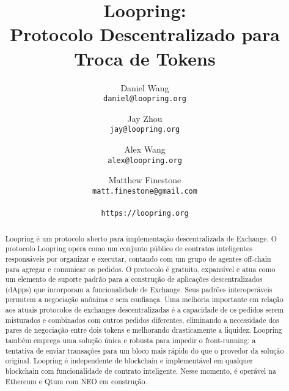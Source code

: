 \documentclass[UTF8,nofonts]{article}
\title{\textbf{Loopring:}\\\textbf{Protocolo Descentralizado para Troca de Tokens}}
\author{
  Daniel Wang\\
  \texttt{daniel@loopring.org}\\
  \and
  	Jay Zhou\\
  	\texttt{jay@loopring.org}\\
  	\and
  	Alex Wang\\
  	\texttt{alex@loopring.org}\\
  	\and
  	Matthew Finestone\\
  	\texttt{matt.finestone@gmail.com}\\ 
  \\
  \texttt{https://loopring.org}
 }
\begin{document}
\maketitle


\begin{abstract}
Loopring é um protocolo aberto para implementação descentralizada de Exchange. O protocolo Loopring opera como um conjunto público de contratos inteligentes responsáveis por organizar e executar, contando com um grupo de agentes off-chain para agregar e comunicar os pedidos. O protocolo é gratuito, expansível e atua como um elemento de suporte padrão para a construção de aplicações descentralizados (dApps) que incorporam a funcionalidade de Exchange. Seus padrões interoperáveis permitem a negociação anônima e sem confiança. Uma melhoria importante em relação aos atuais protocolos de exchanges descentralizadas é a capacidade de os pedidos serem misturados e combinados com outros pedidos diferentes, eliminando a necessidade dos pares de negociação entre dois tokens e melhorando drasticamente a liquidez. Loopring também emprega uma solução única e robusta para impedir o front-running: a tentativa de enviar transações para um bloco mais rápido do que o provedor da solução original. Loopring é independente de blockchain e implementável em qualquer blockchain com funcionalidade de contrato inteligente. Nesse momento, é operável na Ethereum\cite{buterin2017ethereum} \cite{wood2014ethereum} e Qtum \cite{dai2017smart} com NEO \cite{atterlonn2018distributed} em construção.
\end{abstract}
\end{document}
